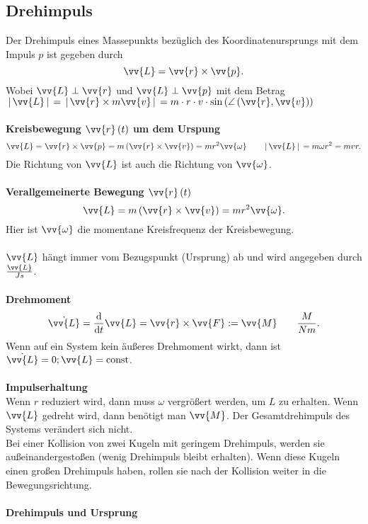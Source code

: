 \documentclass[a4paper,12pt]{article}
\numberwithin{equation}{section}
\begin{document}
\subsection{Drehimpuls}
Der Drehimpuls eines Massepunkts bezüglich des Koordinatenursprungs mit dem Impuls $p$ ist gegeben durch
\[ 
        \vv{L}=\vv{r}\times\vv{p} 
.\] 
Wobei $\vv{L}\perp\vv{r}$ und $\vv{L}\perp\vv{p}$ mit dem Betrag $\,|\, \vv{L}\,|\, =\,|\, \vv{r}\times m\vv{v}\,|\, =m\cdot r\cdot v\cdot \sin \left(\angle\left(\vv{r},\vv{v}\right)\right)$
\\\hfill\\\textbf{Kreisbewegung $\vv{r}\left(t\right)$ um dem Urspung}\\ 
\[ 
        \vv{L}=\vv{r}\times\vv{p}=m\left(\vv{r}\times\vv{v}\right)=mr^2\vv{\omega }\qquad \,|\, \vv{L}\,|\, =m\omega r^2=mvr
.\] 
Die Richtung von $\vv{L}$ ist auch die Richtung von $\vv{\omega }$.
\\\hfill\\\textbf{Verallgemeinerte Bewegung $\vv{r}\left(t\right)$}\\ 
\[ 
        \vv{L}=m\left(\vv{r}\times\vv{v}\right)=mr^2\vv{\omega }
.\] 
Hier ist $\vv{\omega }$ die momentane Kreisfrequenz der Kreisbewegung.\\\\
$\vv{L}$ hängt immer vom Bezugspunkt (Ursprung) ab und wird angegeben durch $\tfrac{\vv{L}}{Js}$.
\\\hfill\\\textbf{Drehmoment}\\ 
\[ 
        \dot{\vv{L}}=\dfrac{\text{d}}{\text{d}t}\vv{L}=\vv{r}\times\vv{F}:=\vv{M}\qquad \dfrac{M}{Nm}
.\] 
Wenn auf ein System kein äußeres Drehmoment wirkt, dann ist $\dot{\vv{L}}=0;\vv{L}=\text{const}$. 
\\\hfill\\\textbf{Impulserhaltung}\\ 
Wenn $r$ reduziert wird, dann muss $\omega $ vergrößert werden, um $L$ zu erhalten. Wenn $\vv{L}$ gedreht wird, dann benötigt man $\vv{M}$. Der Gesamtdrehimpuls des Systems verändert sich nicht.\\Bei einer Kollision von zwei Kugeln mit geringem Drehimpuls, werden sie außeinandergestoßen (wenig Drehimpuls bleibt erhalten). Wenn diese Kugeln einen großen Drehimpuls haben, rollen sie nach der Kollision weiter in die Bewegungsrichtung.
\\\hfill\\\textbf{Drehimpuls und Ursprung}\\ 
\end{document}
